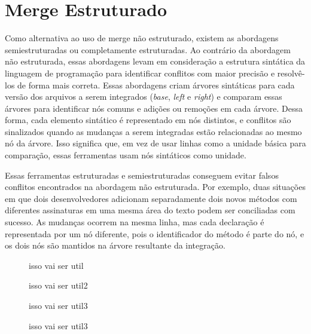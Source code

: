 \section{Merge Estruturado}
Como alternativa ao uso de merge não estruturado, existem as abordagens
semiestruturadas ou completamente estruturadas. Ao contrário da abordagem não
estruturada, essas abordagens levam em consideração a estrutura sintática da
linguagem de programação para identificar conflitos com maior precisão e resolvê-los de
forma mais correta. Essas abordagens criam árvores sintáticas para
cada versão dos arquivos a serem integrados (\emph{base}, \emph{left} e \emph{right})
e comparam essas árvores para identificar nós comuns
e adições ou remoções em cada árvore. Dessa forma, cada elemento sintático
é representado em nós distintos, e conflitos são sinalizados quando as mudanças
a serem integradas estão relacionadas ao mesmo nó da árvore. Isso significa
que, em vez de usar linhas como a unidade básica para comparação, essas ferramentas usam
nós sintáticos como unidade.

Essas ferramentas estruturadas e semiestruturadas conseguem evitar falsos conflitos
encontrados na abordagem não estruturada. Por exemplo, duas situações em
que dois desenvolvedores adicionam separadamente dois novos métodos com diferentes
assinaturas em uma mesma área do texto podem ser conciliadas com sucesso.
As mudanças ocorrem na mesma linha, mas cada declaração é representada por
um nó diferente, pois o identificador do método é parte do nó,
e os dois nós são mantidos na árvore resultante da integração.

\begin{figure}[ht]
\begin{center}
    
\end{center}
\caption[]{isso vai ser util}\label{base_example}
\end{figure}
\begin{figure}[ht]
\begin{center}
    
\end{center}
\caption[]{isso vai ser util2}\label{left_example}
\end{figure}
\begin{figure}[ht]
\begin{center}
    
\end{center}
\caption[]{isso vai ser util3}\label{right_example}
\end{figure}
\begin{figure}[ht]
\begin{center}
    
\end{center}
\caption[]{isso vai ser util3}\label{right_example}
\end{figure}

